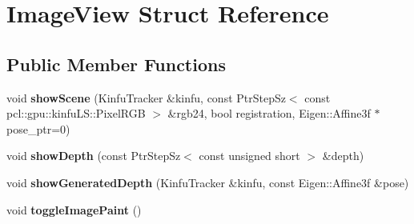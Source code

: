 \hypertarget{struct_image_view}{\section{Image\+View Struct Reference}
\label{struct_image_view}
}
\subsection*{Public Member Functions}
\begin{DoxyCompactItemize}
\item 
\hypertarget{struct_image_view_af942dc3f5e83018d15c7b3033318e188}{void {\bfseries show\+Scene} (Kinfu\+Tracker \&kinfu, const Ptr\+Step\+Sz$<$ const pcl\+::gpu\+::kinfu\+L\+S\+::\+Pixel\+R\+G\+B $>$ \&rgb24, bool registration, Eigen\+::\+Affine3f $\ast$pose\+\_\+ptr=0)}\label{struct_image_view_af942dc3f5e83018d15c7b3033318e188}

\item 
\hypertarget{struct_image_view_a3bec20cc86e59d0c5bf2ad10913d9710}{void {\bfseries show\+Depth} (const Ptr\+Step\+Sz$<$ const unsigned short $>$ \&depth)}\label{struct_image_view_a3bec20cc86e59d0c5bf2ad10913d9710}

\item 
\hypertarget{struct_image_view_a791a70341165462534172328eb3057a9}{void {\bfseries show\+Generated\+Depth} (Kinfu\+Tracker \&kinfu, const Eigen\+::\+Affine3f \&pose)}\label{struct_image_view_a791a70341165462534172328eb3057a9}

\item 
\hypertarget{struct_image_view_a33190e1bb9e52398e2b7f5fc3ee16d48}{void {\bfseries toggle\+Image\+Paint} ()}\label{struct_image_view_a33190e1bb9e52398e2b7f5fc3ee16d48}

\end{DoxyCompactItemize}
